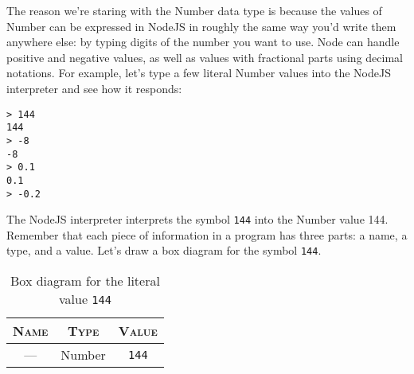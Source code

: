 The reason we're staring with the \textsf{Number} data type is because the values of \textsf{Number} can be expressed in NodeJS in roughly the same way you'd write them anywhere else: by typing digits of the number you want to use. Node can handle positive and negative values, as well as values with fractional parts using decimal notations. For example, let's type a few literal \textsf{Number} values into the NodeJS interpreter and see how it responds:


\suppresslinenumbers
\begin{lstlisting}
> 144
144
> -8
-8
> 0.1
0.1
> -0.2
\end{lstlisting}
\reactivatelinenumbers


The NodeJS interpreter interprets the symbol \texttt{144} into the \textsf{Number} value 144. Remember that each piece of information in a program has three parts: a name, a type, and a value. Let's draw a box diagram for the symbol \texttt{144}.

\begin{table}[h!]
  \begin{tabular}{|c|c|c|}
    \hline
    \textsc{Name} & \textsc{Type} & \textsc{Value}\\
    \hline
    --- & \textsf{Number} & \texttt{144}\\
    \hline
  \end{tabular}
  \caption{Box diagram for the literal value \texttt{144}}
\end{table}

